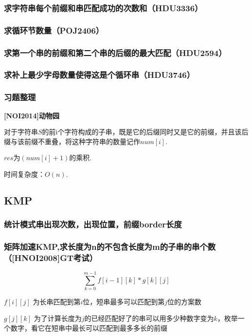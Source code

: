 \documentclass{article}
\begin{document}
\subsubsection{求字符串每个前缀和串匹配成功的次数和（HDU3336）}

\subsubsection{求循环节数量（POJ2406）}

\subsubsection{求第一个串的前缀和第二个串的后缀的最大匹配（HDU2594）}

\subsubsection{求补上最少字母数量使得这是个循环串（HDU3746）}

\subsubsection{习题整理}
\textbf{[NOI2014]动物园}\par
对于字符串$S$的前i个字符构成的子串，既是它的后缀同时又是它的前缀，并且该后缀与该前缀不重叠，将这种字符串的数量记作$num[i]$.\par
$res$为$(num[i]+1)$的乘积.\par
时间复杂度：$O(n).$


\subsection{KMP}
\subsubsection{统计模式串出现次数，出现位置，前缀border长度}

\subsubsection{矩阵加速KMP,求长度为n的不包含长度为m的子串的串个数（[HNOI2008]GT考试）}
$$\sum_{k=0}^{m-1}f[i-1][k]\ast g[k][j]$$\par
$f[i][j]$ 为长串匹配到第$i$位，短串最多可以匹配到第$j$位的方案数\par
$g[j][k]$ 为了计算长度为$j$的已经匹配好了的串可以用多少种数字变为$k$，枚举一个数字，看它在短串中最长可以匹配到最多多长的前缀\par

\end{document}
